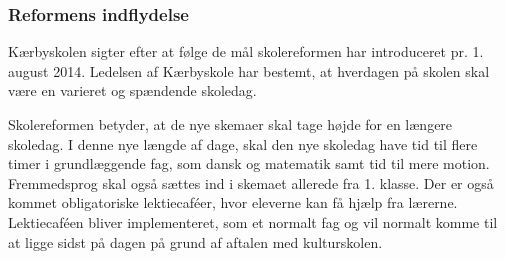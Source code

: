 \subsubsection{Reformens indflydelse}
\label{Reformens_indflydelse}
Kærbyskolen sigter efter at følge de mål skolereformen har introduceret pr. 1. august 2014. Ledelsen af Kærbyskole har bestemt, at hverdagen på skolen skal være en varieret og spændende skoledag.

Skolereformen betyder, at de nye skemaer skal tage højde for en længere skoledag. I denne nye længde af dage, skal den nye skoledag have tid til flere timer i grundlæggende fag, som dansk og matematik samt tid til mere motion. Fremmedsprog skal også sættes ind i skemaet allerede fra 1. klasse. Der er også kommet obligatoriske lektiecaféer, hvor eleverne kan få hjælp fra lærerne. Lektiecaféen bliver implementeret, som et normalt fag og vil normalt komme til at ligge sidst på dagen på grund af aftalen med kulturskolen\cite{kaerby_skolereform}.

